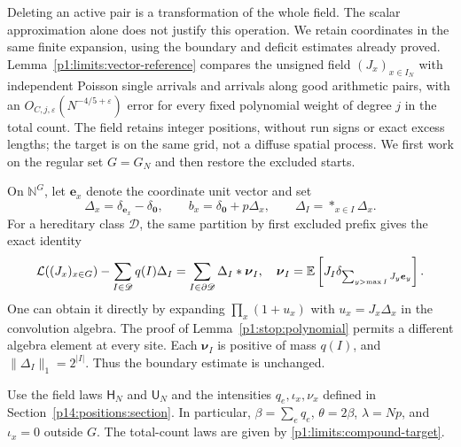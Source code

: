Deleting an active pair is a transformation of the whole field.
The scalar approximation alone does not justify this operation.
We retain coordinates in the same finite expansion, using the
boundary and deficit estimates already proved.
Lemma~\ref{p1:limits:vector-reference} compares the unsigned
field \((J_x)_{x\in I_N}\) with independent Poisson single
arrivals and arrivals along good arithmetic pairs, with an
\(O_{C,j,\varepsilon}(N^{-4/5+\varepsilon})\) error for
every fixed polynomial weight of degree \(j\) in the total count.
The field retains integer positions, without run signs or exact
excess lengths; the target is on the same grid, not a diffuse
spatial process. We first work on the regular set \(G=G_N\)
and then restore the excluded starts.

On $\mathbb N^G$, let $\boldsymbol e_x$ denote the coordinate
unit vector and set
\[
 \Delta_x=\delta_{\boldsymbol e_x}-\delta_{\boldsymbol0},
 \qquad b_x=\delta_{\boldsymbol0}+p\Delta_x,
 \qquad \Delta_I=\mathop{*}_{x\in I}\Delta_x.
\]
For a hereditary class $\mathscr D$, the same partition by first
excluded prefix gives the exact identity
\begin{equation}
 \mathcal L((J_x)_{x\in G})-
       \sum_{I\in\mathscr D}q(I)\Delta_I
 =\sum_{I\in\partial\mathscr D}\Delta_I*\boldsymbol\nu_I,
 \quad
 \boldsymbol\nu_I=
 \mathbb E\left[J_I\delta_{\sum_{y>\max I}J_y\boldsymbol e_y}\right].
 \label{p1:limits:vector-stop}
\end{equation}
One can obtain it directly by expanding
$\prod_x(1+u_x)$ with $u_x=J_x\Delta_x$ in the convolution
algebra.  The proof of Lemma~\ref{p1:stop:polynomial} permits
a different algebra element at every site.  Each
$\boldsymbol\nu_I$ is positive of mass $q(I)$, and
$\|\Delta_I\|_1=2^{|I|}$.  Thus the boundary estimate is
unchanged.

Use the field laws $\mathsf H_N$ and $\mathsf U_N$ and the intensities
$q_e,\iota_x,\nu_x$ defined in Section~\ref{p14:positions:section}. In
particular, $\beta=\sum_e q_e$, $\theta=2\beta$, $\lambda=Np$, and
$\iota_x=0$ outside $G$. The total-count laws are given by
\eqref{p1:limits:compound-target}.

